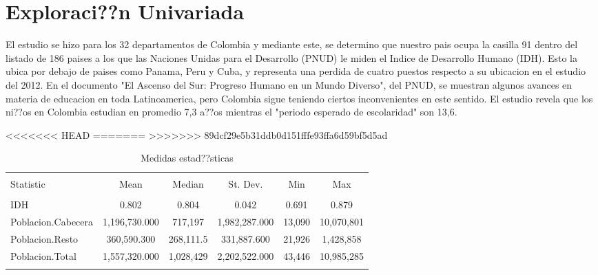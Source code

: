 \section{Exploraci??n Univariada}\label{univariada}




El estudio se hizo para los 32 departamentos de Colombia y mediante este, se determino que nuestro pais ocupa la casilla 91 dentro del listado de 186 paises a los que las Naciones Unidas para el Desarrollo (PNUD) le miden el Indice de Desarrollo Humano (IDH). 
Esto la ubica por debajo de paises como Panama, Peru y Cuba, y representa una perdida de cuatro puestos respecto a su ubicacion en el estudio del 2012.  
En el documento "El Ascenso del Sur: Progreso Humano en un Mundo Diverso", del PNUD, se muestran algunos avances en materia de educacion en toda Latinoamerica, pero Colombia sigue teniendo ciertos inconvenientes en este sentido.  
El estudio revela que los ni??os en Colombia estudian en promedio 7,3 a??os mientras el "periodo esperado de escolaridad" son 13,6. 

<<<<<<< HEAD
=======
>>>>>>> 89dcf29e5b31ddb0d151fffe93ffa6d59bf5d5ad
\begin{table}[!htbp] \centering 
  \caption{Medidas estad??sticas} 
  \label{stats} 
\begin{tabular}{@{\extracolsep{5pt}}lccccc} 
\\[-1.8ex]\hline 
\hline \\[-1.8ex] 
Statistic & \multicolumn{1}{c}{Mean} & \multicolumn{1}{c}{Median} & \multicolumn{1}{c}{St. Dev.} & \multicolumn{1}{c}{Min} & \multicolumn{1}{c}{Max} \\ 
\hline \\[-1.8ex] 
IDH & 0.802 & 0.804 & 0.042 & 0.691 & 0.879 \\ 
Poblacion.Cabecera & 1,196,730.000 & 717,197 & 1,982,287.000 & 13,090 & 10,070,801 \\ 
Poblacion.Resto & 360,590.300 & 268,111.5 & 331,887.600 & 21,926 & 1,428,858 \\ 
Poblacion.Total & 1,557,320.000 & 1,028,429 & 2,202,522.000 & 43,446 & 10,985,285 \\ 
\hline \\[-1.8ex] 
\end{tabular} 
\end{table} \centering


